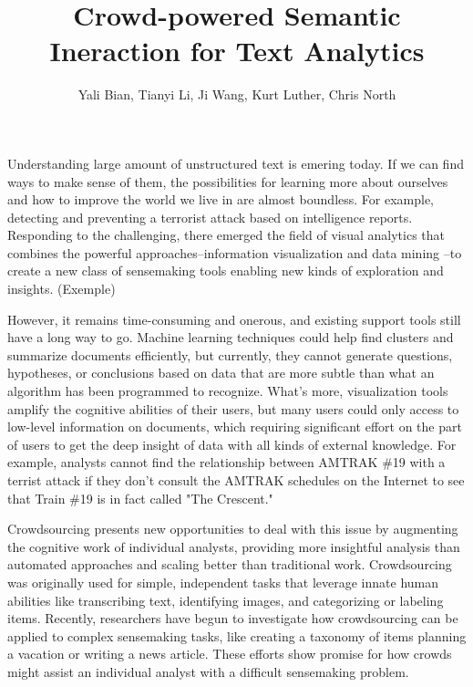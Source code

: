 \documentclass[journal]{vgtc}                %
\title{Crowd-powered Semantic Ineraction for Text Analytics}
\author{Yali Bian, Tianyi Li, Ji Wang, Kurt Luther, Chris North}
\begin{document}
\maketitle
Understanding large amount of unstructured text is emering today. If we can find ways to make sense of them, the possibilities for learning more about ourselves and how to improve the world we live in are almost boundless. 
For example, detecting and preventing a terrorist attack based on intelligence reports. Responding to the challenging, there emerged the field of visual analytics\cite{Thomas2005} that combines the powerful approaches--information visualization\cite{card1999readings} and data mining\cite{berry1997data} --to create a new class of sensemaking tools\cite{Pirolli2005} enabling new kinds of exploration and insights. (Exemple)

However, it remains time-consuming and onerous, and existing support tools still have a long way to go. Machine learning techniques could help find clusters and summarize documents efficiently, but currently, they cannot generate questions, hypotheses, or conclusions based on data that are more subtle than what an algorithm has been programmed to recognize. What's more, visualization tools amplify the cognitive abilities of their users, but many users could only access to low-level information on documents, which requiring significant effort on the part of users to get the deep insight of data with all kinds of external knowledge. For example, analysts cannot find the relationship between AMTRAK \#19 with a terrist attack if they don't consult the AMTRAK schedules on the Internet to see that Train \#19 is in fact called "The Crescent."


Crowdsourcing presents new opportunities to deal with this issue by augmenting the cognitive work of individual analysts, providing more insightful analysis than automated approaches and scaling better than traditional work. Crowdsourcing was originally used for simple, independent tasks that leverage innate human abilities like transcribing text\cite{causer2012transcription}, identifying images\cite{gupta2013faking}, and categorizing or labeling items\cite{bragg2013crowdsourcing}. Recently, researchers have begun to investigate how crowdsourcing can be applied to complex sensemaking tasks, like creating a taxonomy of items\cite{Chilton2013} planning a vacation\cite{Zhang2012} or writing a news article\cite{kittur2011crowdforge}. These efforts show promise for how crowds might assist an individual analyst with a difficult sensemaking problem.
\end{document}
